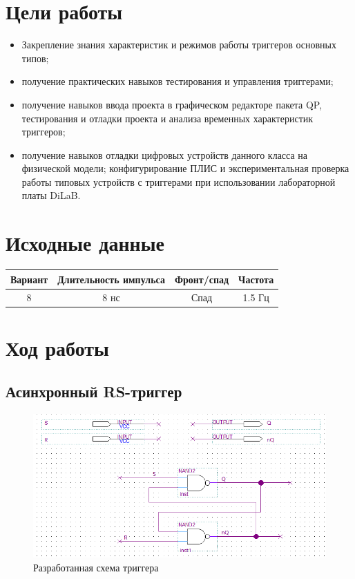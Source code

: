 \documentclass[a4paper,12pt]{article}
\begin{document}
    


    \section{Цели работы}
    \begin{itemize}
        \item Закрепление знания характеристик и режимов работы триггеров основных типов;
        \item получение практических навыков тестирования и управления триггерами;
        \item получение навыков ввода проекта в графическом редакторе пакета QP, тестирования
        и отладки проекта и анализа временных характеристик триггеров;
        \item получение навыков отладки цифровых устройств данного класса на физической модели;
        конфигурирование ПЛИС и экспериментальная проверка работы типовых устройств с триггерами
        при использовании лабораторной платы DiLaB.
    \end{itemize}
    \section{Исходные данные}
    \begin{table}[H]
        \centering
        \begin{tabular}{|c|c|c|c|}
            \hline Вариант & Длительность импульса & Фронт/спад & Частота \\
            \hline 8 & 8 нс & Спад & 1.5 Гц \\
            \hline
        \end{tabular}
    \end{table}
    \section{Ход работы}
    \subsection{Асинхронный RS-триггер}

    \begin{figure}[H]
		\centering
		\includegraphics[width=\linewidth]{polytech/scheme/report-lab3/subfiles/images/scheme-1}
		\caption{Разработанная схема триггера}
		\label{fig:scheme-1}
	\end{figure}
    
\end{document}
